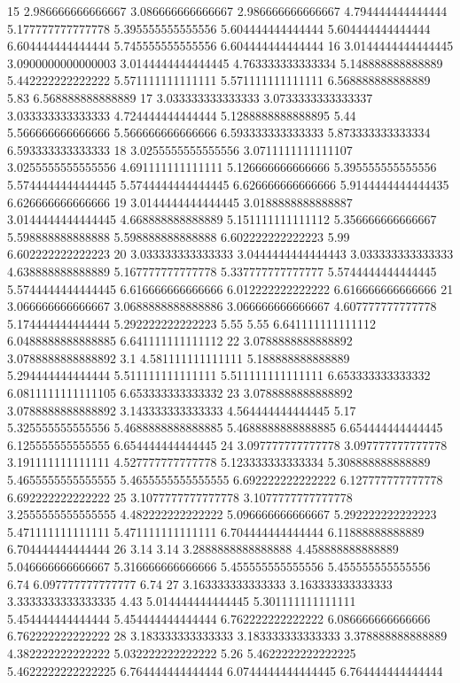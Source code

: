 15 2.986666666666667 3.086666666666667 2.986666666666667 4.794444444444444 5.177777777777778 5.395555555555556 5.604444444444444 5.604444444444444 6.604444444444444 5.745555555555556 6.604444444444444
16 3.0144444444444445 3.0900000000000003 3.0144444444444445 4.763333333333334 5.148888888888889 5.442222222222222 5.571111111111111 5.571111111111111 6.568888888888889 5.83 6.568888888888889
17 3.033333333333333 3.0733333333333337 3.033333333333333 4.724444444444444 5.1288888888888895 5.44 5.566666666666666 5.566666666666666 6.593333333333333 5.873333333333334 6.593333333333333
18 3.0255555555555556 3.0711111111111107 3.0255555555555556 4.691111111111111 5.126666666666666 5.395555555555556 5.5744444444444445 5.5744444444444445 6.626666666666666 5.9144444444444435 6.626666666666666
19 3.0144444444444445 3.0188888888888887 3.0144444444444445 4.668888888888889 5.151111111111112 5.356666666666667 5.598888888888888 5.598888888888888 6.602222222222223 5.99 6.602222222222223
20 3.033333333333333 3.0444444444444443 3.033333333333333 4.638888888888889 5.167777777777778 5.337777777777777 5.5744444444444445 5.5744444444444445 6.616666666666666 6.012222222222222 6.616666666666666
21 3.066666666666667 3.0688888888888886 3.066666666666667 4.607777777777778 5.174444444444444 5.292222222222223 5.55 5.55 6.641111111111112 6.0488888888888885 6.641111111111112
22 3.0788888888888892 3.0788888888888892 3.1 4.581111111111111 5.188888888888889 5.294444444444444 5.511111111111111 5.511111111111111 6.653333333333332 6.0811111111111105 6.653333333333332
23 3.0788888888888892 3.0788888888888892 3.143333333333333 4.564444444444445 5.17 5.325555555555556 5.4688888888888885 5.4688888888888885 6.654444444444445 6.125555555555555 6.654444444444445
24 3.097777777777778 3.097777777777778 3.191111111111111 4.527777777777778 5.123333333333334 5.308888888888889 5.4655555555555555 5.4655555555555555 6.692222222222222 6.127777777777778 6.692222222222222
25 3.1077777777777778 3.1077777777777778 3.2555555555555555 4.482222222222222 5.096666666666667 5.292222222222223 5.471111111111111 5.471111111111111 6.704444444444444 6.11888888888889 6.704444444444444
26 3.14 3.14 3.2888888888888888 4.458888888888889 5.046666666666667 5.316666666666666 5.455555555555556 5.455555555555556 6.74 6.097777777777777 6.74
27 3.163333333333333 3.163333333333333 3.3333333333333335 4.43 5.014444444444445 5.301111111111111 5.454444444444444 5.454444444444444 6.762222222222222 6.086666666666666 6.762222222222222
28 3.183333333333333 3.183333333333333 3.378888888888889 4.382222222222222 5.032222222222222 5.26 5.4622222222222225 5.4622222222222225 6.764444444444444 6.0744444444444445 6.764444444444444
